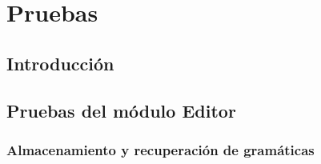 \chapter{Pruebas}\label{cap:pruebas}

\section{Introducción}






\section{Pruebas del módulo Editor}



\subsection{Almacenamiento y recuperación de gramáticas}


